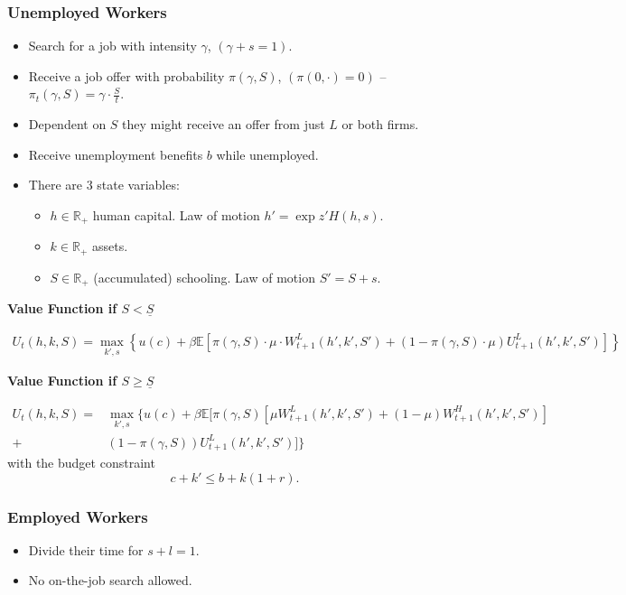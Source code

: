 \subsubsection{Unemployed Workers}
\begin{itemize}
    \item Search for a job with intensity $\gamma$, $(\gamma + s = 1)$.
    \item Receive a job offer with probability $\pi(\gamma, S)$, $(\pi(0,\cdot) = 0)$ -- $ \pi_t(\gamma, S) = \gamma \cdot \frac{S}{t} $.
    \item Dependent on $S$ they might receive an offer from just $L$ or both firms.
    \item Receive unemployment benefits $b$ while unemployed.
    
    \item There are $3$ state variables:
    \begin{itemize}
    	\item $h \in \mathbb{R}_+$ human capital. Law of motion $ h' = \exp{z'} H(h,s) $.
    	\item $k \in \mathbb{R}_+$ assets.
    	\item $S \in \mathbb{R}_+$ (accumulated) schooling. Law of motion $ S' = S + s $.
    \end{itemize}
\end{itemize}

\textbf{Value Function if $S < \underline{S}$}

\begin{align*}
    U_t(h,k,S) =  \max_{k',s} \left\{ u(c) + \beta\mathbb{E}\left[\pi(\gamma, S) \cdot \mu \cdot W^L_{t+1}(h',k',S')
    + (1 - \pi(\gamma, S) \cdot \mu)U^L_{t+1}(h',k',S')  \right] \right\}
\end{align*}


\textbf{Value Function if $S \geq \underline{S}$}

\begin{align*}
	U_t(h,k,S) = &  \max_{k',s} \biggl\{ u(c) + \beta\mathbb{E}\biggl[\pi(\gamma, S) \left[\mu W^L_{t+1}(h',k',S') + (1 - \mu) W^H_{t+1}(h',k',S') \right]  \\
		+ & (1 - \pi(\gamma, S)) U^L_{t+1}(h',k',S')  \biggr] \biggr\}
\end{align*}
with the budget constraint \[  c + k' \leq b + k(1+r). \]

\subsubsection{Employed Workers}
\begin{itemize}
	\item Divide their time for $ s + l = 1 $.
	\item No on-the-job search allowed.
\end{itemize}

